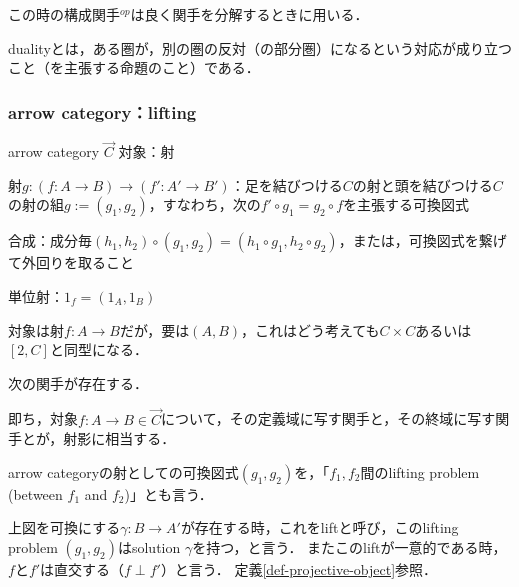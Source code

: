 \documentclass[uplatex, 12pt, dvipdfmx]{jsarticle}
\begin{document}
この時の構成関手${}^{op}$は良く関手を分解するときに用いる．

dualityとは，ある圏が，別の圏の反対（の部分圏）になるという対応が成り立つこと（を主張する命題のこと）である．

\subsubsection{arrow category：lifting}

\begin{itembox}[l]{arrow category $\overrightarrow{C}$}
    対象：射

    射$g:(f:A\to B)\to (f':A'\to B')$：足を結びつける$C$の射と頭を結びつける$C$の射の組$g:=(g_1,g_2)$，すなわち，次の$f'\circ g_1=g_2\circ f$を主張する可換図式
    \begin{center}\end{center}
    合成：成分毎$(h_1,h_2)\circ (g_1,g_2)=(h_1\circ g_1, h_2\circ g_2)$，または，可換図式を繋げて外回りを取ること
    
    単位射：$1_f=(1_A,1_B)$
\end{itembox}

対象は射$f:A\to B$だが，要は$(A,B)$，これはどう考えても$C\times C$あるいは$[2,C]$と同型になる．
\begin{proposition*}
    次の関手が存在する．
\begin{center}\end{center}
    即ち，対象$f:A\to B\in\overrightarrow{C}$について，その定義域に写す関手と，その終域に写す関手とが，射影に相当する．
\end{proposition*}

\begin{remark*}
    arrow categoryの射としての可換図式$(g_1,g_2)$を，「$f_1,f_2$間のlifting problem (between $f_1$ and $f_2$)」とも言う．
    \begin{center}\end{center}
    上図を可換にする$\gamma:B\to A'$が存在する時，これをliftと呼び，このlifting problem $(g_1,g_2)$はsolution $\gamma$を持つ，と言う．
    またこのliftが一意的である時，$f$と$f'$は直交する（$f\perp f'$）と言う．
    定義\ref{def-projective-object}参照．
\end{remark*}
\end{document}
